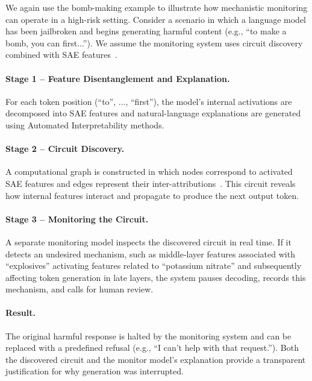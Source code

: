 \begin{examplebox}
We again use the bomb-making example to illustrate how mechanistic monitoring can operate in a high-risk setting. Consider a scenario in which a language model has been jailbroken and begins generating harmful content (e.g., ``to make a bomb, you can first...''). We assume the monitoring system uses circuit discovery combined with SAE features~.\\

\paragraph{Stage 1 -- Feature Disentanglement and Explanation.} For each token position (``to'', ..., ``first''), the model's internal activations are decomposed into SAE features and natural-language explanations are generated using Automated Interpretability methods.\\

\paragraph{Stage 2 -- Circuit Discovery.} A computational graph is constructed in which nodes correspond to activated SAE features and edges represent their inter-attributions~. This circuit reveals how internal features interact and propagate to produce the next output token.\\

\paragraph{Stage 3 -- Monitoring the Circuit.} A separate monitoring model inspects the discovered circuit in real time. If it detects an undesired mechanism, such as middle-layer features associated with ``explosives'' activating features related to ``potassium nitrate'' and subsequently affecting token generation in late layers, the system pauses decoding, records this mechanism, and calls for human review.\\

\paragraph{Result.} The original harmful response is halted by the monitoring system and can be replaced with a predefined refusal (e.g., ``I can't help with that request.''). Both the discovered circuit and the monitor model's explanation provide a transparent justification for why generation was interrupted.

\end{examplebox}

